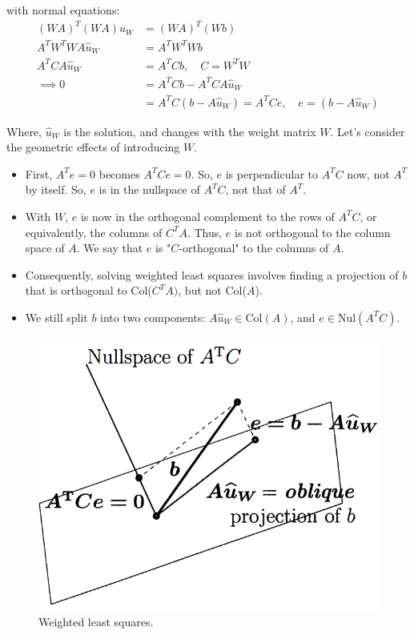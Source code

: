 \documentclass[]{article}
\begin{document}
with normal equations:
\begin{align}
(WA)^T (WA) \hat{u}_W &= (WA)^T (Wb) \\
A^T W^T W A \hat{u}_W &= A^T W^T W b \\
A^T C A \hat{u}_W &= A^T C b, \quad C = W^T W \\
\implies 0 &= A^T C b - A^T C A \hat{u}_W \\
	&= A^T C (b - A \hat{u}_W ) = A^T C e, \quad e = (b - A \hat{u}_W )
\end{align}

Where, $\hat{u}_W$ is the solution, and changes with the weight matrix $W$. Let's consider the geometric effects of introducing $W$. 
\begin{itemize}
	\item First, $A^T e = 0$ becomes $A^T C e = 0$. So, $e$ is perpendicular to $A^T C$ now, not $A^T$ by itself. So, $e$ is in the nullspace of $A^T C$, not that of $A^T$.
	\item With $W$, $e$ is now in the orthogonal complement to the rows of $A^T C$, or equivalently, the columns of $C^T A$. Thus, $e$ is not orthogonal to the column space of $A$. We say that $e$ is "$C$-orthogonal" to the columns of $A$. 
	\item Consequently, solving weighted least squares involves finding a projection of $b$ that is orthogonal to Col($C^T A)$, but not Col($A$).
	\item We still split $b$ into two components: $A\hat{u}_W \in \textrm{Col}(A)$, and $e \in \textrm{Nul}(A^T C)$.
\end{itemize}

\begin{figure}[H]
	\centering
	\includegraphics[width=0.7\linewidth]{figs/Strang_projection_wlsq}
	\caption{Weighted least squares.}
	\label{fig:strangprojectionwlsq}
\end{figure}
\end{document}
